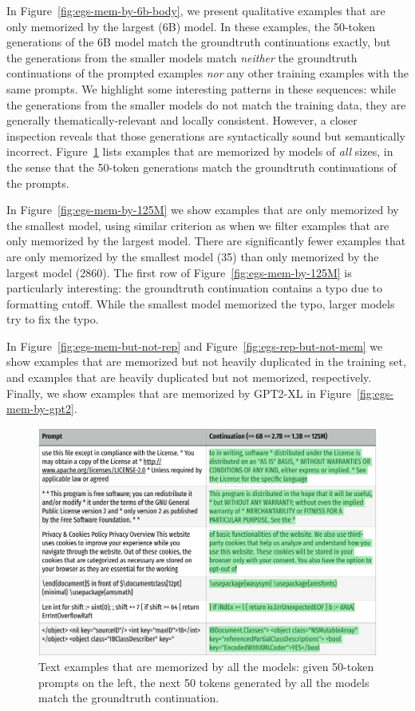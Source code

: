 In Figure~\ref{fig:egs-mem-by-6b-body}, we present qualitative examples that are only memorized by the largest (6B) model.
In these examples, the 50-token generations of the 6B model match the groundtruth continuations exactly, but the generations from the smaller models match \emph{neither} the groundtruth continuations of the prompted examples \emph{nor} any other training examples with the same prompts.
We highlight some interesting patterns in these sequences: while the generations from the smaller models do not match the training data, they are generally thematically-relevant and locally consistent. However, a closer inspection reveals that those generations are syntactically sound but semantically incorrect.
Figure~\ref{fig:egs-mem-by-all} lists examples that are memorized by models of \emph{all} sizes, in the sense that the 50-token generations match the groundtruth continuations of the prompts.


In Figure~\ref{fig:egs-mem-by-125M} we show examples that are only memorized by the smallest model, using similar criterion as when we filter examples that are only memorized by the largest model. There are significantly fewer examples that are only memorized by the smallest model (35) than only memorized by the largest model (2860).
The first row of Figure~\ref{fig:egs-mem-by-125M} is particularly interesting: the groundtruth continuation contains a typo due to formatting cutoff.
While the smallest model memorized the typo, larger models try to fix the typo.

In Figure~\ref{fig:egs-mem-but-not-rep} and Figure~\ref{fig:egs-rep-but-not-mem} we show examples that are memorized but not heavily duplicated in the training set, and examples that are heavily duplicated but not memorized, respectively. Finally, we show examples that are memorized by GPT2-XL in Figure~\ref{fig:egs-mem-by-gpt2}.

\begin{figure}
    \centering
    \includegraphics[width=.8\linewidth]{figures/text-egs/style2-mem-by-all_pg1.pdf}
    \caption{Text examples that are memorized by all the models: given 50-token prompts on the left, the next 50 tokens generated by all the models match the groundtruth continuation.}
    \label{fig:egs-mem-by-all}
\end{figure}


